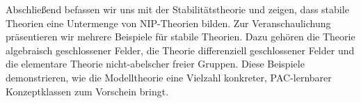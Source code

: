 \begin{outline}
Abschließend befassen wir uns mit der Stabilitätstheorie und zeigen, dass stabile Theorien eine Untermenge von NIP-Theorien bilden. Zur Veranschaulichung präsentieren wir mehrere Beispiele für stabile Theorien. Dazu gehören die Theorie algebraisch geschlossener Felder, die Theorie differenziell geschlossener Felder und die elementare Theorie nicht-abelscher freier Gruppen. Diese Beispiele demonstrieren, wie die Modelltheorie eine Vielzahl konkreter, PAC-lernbarer Konzeptklassen zum Vorschein bringt.
\end{outline}


